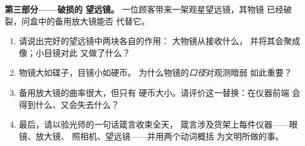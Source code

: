 \begin{problem}
\medskip\noindent\textbf{第三部分——破损的
望远镜。}
一位顾客带来一架观星望远镜，其物镜
已经破裂，问盒中的备用放大镜能否
代替它。
\begin{enumerate}[resume]
  \item 请说出完好的望远镜中两块各自的作用：
        大物镜从接收什么，
        并将其会聚成像；小目镜对此
        又做了什么？
  \item 物镜大如碟子，目镜小如硬币。
        为什么物镜的\emph{口径}对观测暗弱
        如此重要？
  \item 备用放大镜的曲率很大，但只有
        硬币大小。请评价这一替换：在仪器前端
        会得到什么、又会失去什么？
  \item 最后，请以验光师的一句话箴言收束全天，
        箴言涉及货架上每件仪器——眼镜、放大镜、
        照相机、望远镜——并用两个动词概括
        为文明所做的事。
\end{enumerate}
\end{problem}

